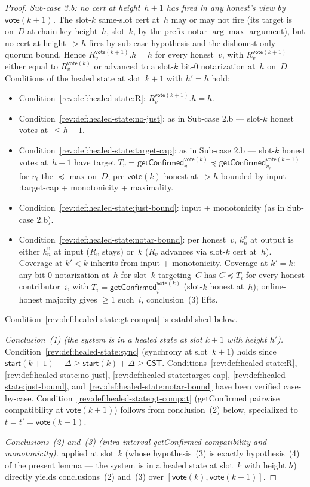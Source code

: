 \documentclass{article}
\newcommand{\start}{\mathsf{start}}
\newcommand{\vote}{\mathsf{vote}}
\newcommand{\comm}[1]{\bar{#1}}
\newcommand{\getConfirmed}{\textsf{getConfirmed}\xspace}
\theoremstyle{plain}
\theoremstyle{definition}
\theoremstyle{remark}
\newcommand{\GST}{\ensuremath{\mathsf{GST}}}
\newcommand{\OHM}{online-honest majority\xspace}
\begin{document}
\begin{proof}
\emph{Sub-case 3.b: no cert at height~$h+1$ has fired in any honest's view by $\vote(k+1)$.}
The slot-$k$ same-slot cert at~$h$ may or may not fire (its target is on~$D$ at chain-key height~$h$, slot~$k$, by the prefix-notar $\arg\max$ argument), but no cert at height~$>h$ fires by sub-case hypothesis and the dishonest-only-quorum bound. Hence $R_v^{\vote(k+1)}.h = h$ for every honest~$v$, with $R_v^{\vote(k+1)}$ either equal to $R_v^{\vote(k)}$ or advanced to a slot-$k$ bit-$0$ notarization at~$h$ on~$D$. Conditions of the healed state at slot~$k+1$ with $\comm{h}' = h$ hold:
\begin{itemize}
  \item Condition~\ref{rev:def:healed-state:R}: $R_v^{\vote(k+1)}.h = h$.
  \item Condition~\ref{rev:def:healed-state:no-just}: as in Sub-case 2.b — slot-$k$ honest votes at~$\leq h+1$.
  \item Condition~\ref{rev:def:healed-state:target-cap}: as in Sub-case 2.b — slot-$k$ honest votes at~$h+1$ have target $T_v = \getConfirmed_v^{\vote(k)} \preceq \getConfirmed_{v_\ell}^{\vote(k+1)}$ for $v_\ell$ the $\preceq$-max on~$D$; pre-$\vote(k)$ honest at~$>h$ bounded by input :target-cap + monotonicity + maximality.
  \item Condition~\ref{rev:def:healed-state:just-bound}: input + monotonicity (as in Sub-case 2.b).
  \item Condition~\ref{rev:def:healed-state:notar-bound}: per honest~$v$, $k_n^v$ at output is either $k_n^v$ at input ($R_v$ stays) or~$k$ ($R_v$ advances via slot-$k$ cert at~$h$). Coverage at $k' < k$ inherits from input + monotonicity. Coverage at $k' = k$: any bit-$0$ notarization at~$h$ for slot~$k$ targeting~$C$ has $C \preceq T_i$ for every honest contributor~$i$, with $T_i = \getConfirmed_i^{\vote(k)}$ (slot-$k$ honest at~$h$); \OHM gives $\geq 1$ such~$i$, conclusion~(3) lifts.
\end{itemize}
Condition~\ref{rev:def:healed-state:gt-compat} is established below.

\emph{Conclusion~(1) (the system is in a healed state at slot $k+1$ with height $\comm{h}'$).}
Condition~\ref{rev:def:healed-state:sync} (synchrony at slot~$k+1$) holds since $\start(k+1) - \Delta \geq \start(k) + \Delta \geq \GST$. Conditions~\ref{rev:def:healed-state:R}, \ref{rev:def:healed-state:no-just}, \ref{rev:def:healed-state:target-cap}, \ref{rev:def:healed-state:just-bound}, and~\ref{rev:def:healed-state:notar-bound} have been verified case-by-case. Condition~\ref{rev:def:healed-state:gt-compat} (\getConfirmed{} pairwise compatibility at $\vote(k+1)$) follows from conclusion~(2) below, specialized to $t = t' = \vote(k+1)$.

\emph{Conclusions~(2) and~(3) (intra-interval \getConfirmed{} compatibility and monotonicity).}
 applied at slot~$k$ (whose hypothesis~(3) is exactly hypothesis~(4) of the present lemma — the system is in a healed state at slot~$k$ with height $\comm{h}$) directly yields conclusions~(2) and~(3) over $[\vote(k),\vote(k+1)]$.
\end{proof}
\end{document}
